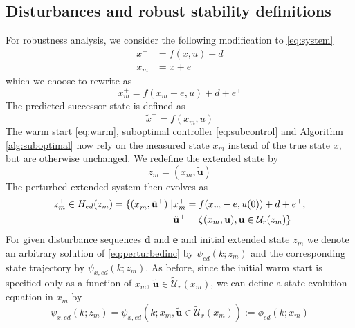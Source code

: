 \documentclass{article}
\begin{document}
\subsection{Disturbances and robust stability definitions}
For robustness analysis, we consider the following modification to \eqref{eq:system}
\begin{align*}
\label{eq:disturbed}
x^+ &= f(x,u) + d \\
x_m &= x + e
\end{align*}
which we choose to rewrite as
\begin{equation}
\label{eq:disturbed}
x_m^+ = f(x_m-e,u) + d + e^+
\end{equation}
The predicted successor state is defined as
\begin{equation*}
\tilde{x}^+ = f(x_m,u)
\end{equation*}
The warm start \eqref{eq:warm}, suboptimal controller \eqref{eq:subcontrol} and Algorithm \ref{alg:suboptimal} now rely
on the measured state $x_m$ instead of the true state $x$, but are otherwise unchanged.
We redefine the extended state by
\begin{equation*}
z_m = (x_m,\tilde{\mathbf{u}})
\end{equation*}
The perturbed extended system then evolves as
\begin{align}
z_m^+ \in H_{ed}(z_m) 
= \{(x_m^+,\tilde{\mathbf{u}}^+) \mid 
&x_m^+ = f(x_m-e,u(0))+d+e^+, \notag \\
&\tilde{\mathbf{u}}^+ = \zeta(x_m,\mathbf{u}), \mathbf{u} \in
\mathcal{U}_r(z_m)\} \label{eq:perturbedinc}  
\end{align}
For given disturbance sequences $\mathbf{d}$ and $\mathbf{e}$
and initial extended state $z_m$ we denote an arbitrary solution of 
\eqref{eq:perturbedinc}
by $\psi_{ed}(k;z_m)$ and the corresponding state trajectory by $\psi_{x,ed}(k;z_m)$. As before,
since the initial warm start is specified only as a function of $x_m$, 
$\tilde{\mathbf{u}} \in \tilde{\mathcal{U}}_r(x_m)$,
we can define a state evolution equation in $x_m$ by
\begin{equation}
\label{eq:perturbedincx}
\psi_{x,ed}(k;z_m) = \psi_{x,ed}(k;x_m,\tilde{\mathbf{u}} \in \tilde{\mathcal{U}}_r(x_m)) := \phi_{ed}(k;x_m)
\end{equation}
\end{document}
